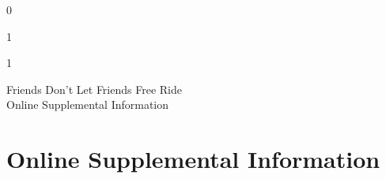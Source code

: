 \documentclass[12pt]{article}
\newcommand{\jop}{0} %
\begin{document}



\if\jop0
\pagebreak
\newpage
\fi



\pagebreak







\if\jop1
\linespread{1}\selectfont
\fi

\if\jop1
\newpage

\vspace*{2cm}
\begin{center}
\Huge Friends Don't Let Friends Free Ride \\[.1cm]
\large Online Supplemental Information
\end{center}
\setcounter{page}{1}

\fi

\newpage

\appendix

\part{Online Supplemental Information}

\noptcrule

\parttoc[n]

\renewcommand\thefigure{\thesection.\arabic{figure}}

\renewcommand\thetable{\thesection.\arabic{figure}}


\newpage





\end{document}
